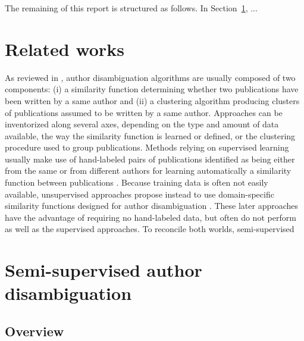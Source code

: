 \documentclass{article}
\begin{document}
The remaining of this report is structured as follows. In Section~\ref{related-works}, ...



\section{Related works}
\label{related-works}

As reviewed in
\citep{smalheiser2009author,ferreira2012brief,levin2012citation}, author
disambiguation algorithms are usually composed of two components: (i) a
similarity function determining whether two publications have been written by a
same author and (ii) a clustering algorithm producing clusters of publications
assumed to be written by a same author. Approaches can be inventorized along
several axes, depending on the type and amount of data available, the way the
similarity function is learned or defined, or the clustering procedure used to
group publications. Methods relying on supervised learning usually make use of
hand-labeled pairs of publications identified as being either from the same or
from different authors for learning automatically a similarity function between
publications \citep{han2004two,huang2006efficient,
culotta2007author,treeratpituk2009disambiguating,tran2014author}. Because
training data is often not easily available, unsupervised approaches propose
instead to use domain-specific similarity functions designed for author
disambiguation
\citep{malin2005unsupervised,mcrae2006also,song2007efficient,kang2009co,fan2011graph,schulz2014exploiting}.
These later approaches have the advantage of requiring no hand-labeled data, but
often do not perform as well as the supervised approaches. To reconcile
both worlds, semi-supervised





\section{Semi-supervised author disambiguation}
\label{methods}

\subsection{Overview}
\end{document}
